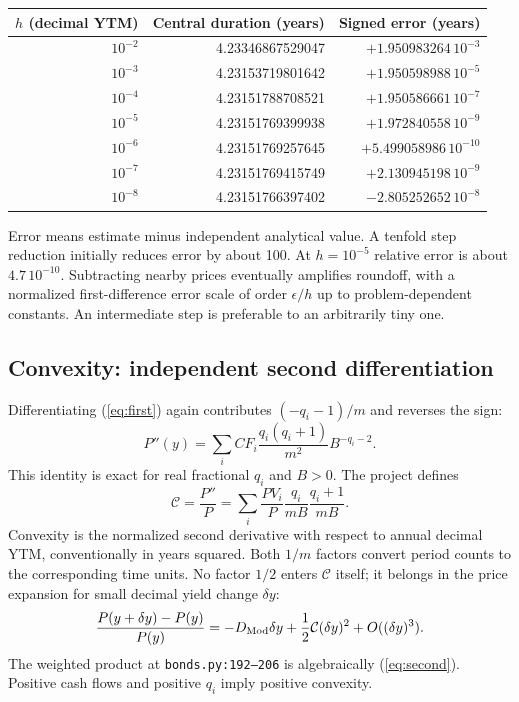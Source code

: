 \documentclass[12pt,a4paper]{article}
\begin{document}
\begin{center}\small
\begin{tabular}{@{}rrr@{}}
\toprule
$h$ (decimal YTM) & Central duration (years) & Signed error (years)\\
\midrule
$10^{-2}$ & 4.23346867529047 & $+1.950983264\,10^{-3}$\\
$10^{-3}$ & 4.23153719801642 & $+1.950598988\,10^{-5}$\\
$10^{-4}$ & 4.23151788708521 & $+1.950586661\,10^{-7}$\\
$10^{-5}$ & 4.23151769399938 & $+1.972840558\,10^{-9}$\\
$10^{-6}$ & 4.23151769257645 & $+5.499058986\,10^{-10}$\\
$10^{-7}$ & 4.23151769415749 & $+2.130945198\,10^{-9}$\\
$10^{-8}$ & 4.23151766397402 & $-2.805252652\,10^{-8}$\\
\bottomrule
\end{tabular}
\end{center}
Error means estimate minus independent analytical value. A tenfold step
reduction initially reduces error by about 100. At $h=10^{-5}$ relative
error is about $4.7\,10^{-10}$. Subtracting nearby prices eventually
amplifies roundoff, with a normalized first-difference error scale of
order $\epsilon/h$ up to problem-dependent constants. An intermediate
step is preferable to an arbitrarily tiny one.

\subsection{Convexity: independent second differentiation}
Differentiating (\ref{eq:first}) again contributes $(-q_i-1)/m$ and
reverses the sign:
\begin{equation}\label{eq:second}
 P''(y)=\sum_i CF_i\frac{q_i(q_i+1)}{m^2}B^{-q_i-2}.
\end{equation}
This identity is exact for real fractional $q_i$ and $B>0$. The project defines
\begin{equation}
 \mathcal C=\frac{P''}P
 =\sum_i\frac{PV_i}P\frac{q_i}{mB}\frac{q_i+1}{mB}.
\end{equation}
Convexity is the normalized second derivative with respect to annual
decimal YTM, conventionally in years squared. Both $1/m$ factors convert
period counts to the corresponding time units. No factor $1/2$ enters
$\mathcal C$ itself; it belongs in the price expansion for small decimal
yield change $\delta y$:
\begin{equation}
 \frac{P(y+\delta y)-P(y)}{P(y)}
 =-D_{\rm Mod}\delta y+\frac12\mathcal C(\delta y)^2+O((\delta y)^3).
\end{equation}
The weighted product at \texttt{bonds.py:192--206} is algebraically
(\ref{eq:second}). Positive cash flows and positive $q_i$ imply
positive convexity.
\end{document}
